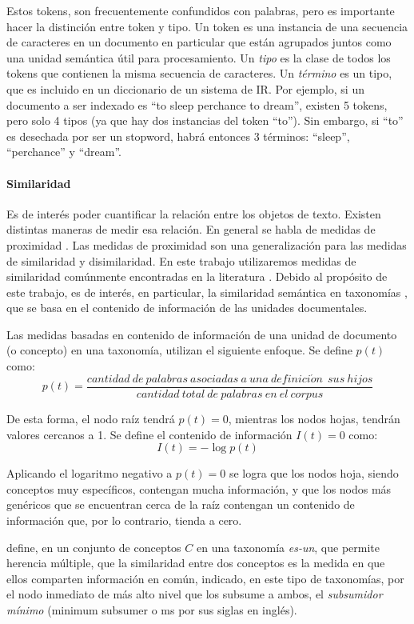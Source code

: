 Estos tokens, son frecuentemente confundidos con palabras, pero es importante hacer la distinción entre token y tipo. Un token es una instancia de una secuencia de caracteres en un documento en particular que están agrupados juntos como una unidad semántica útil para procesamiento. Un \textit{tipo} es la clase de todos los tokens que contienen la misma secuencia de caracteres. Un \textit{término} es un tipo, que es incluido en un diccionario de un sistema de IR. Por ejemplo, si un documento a ser indexado es “to sleep perchance to dream”, existen 5 tokens, pero solo 4 tipos (ya que hay dos instancias del token “to”). Sin embargo, si “to” es desechada por ser un stopword, habrá entonces 3 términos: “sleep”, “perchance” y “dream”.

\paragraph{Similaridad}
Es de interés poder cuantificar la relación entre los objetos de texto. Existen distintas maneras de medir esa relación. En general se habla de medidas de proximidad \citep{xu2008clustering}. Las medidas de proximidad son una generalización para las medidas de similaridad y disimilaridad. En este trabajo utilizaremos medidas de similaridad comúnmente encontradas en la literatura \citep{resnik1995using, lin1998information, gomaa2013survey, harispe2015semantic}. Debido al propósito de este trabajo, es de interés, en particular, la similaridad semántica en taxonomías \citep{resnik1995using}, que se basa en el contenido de información de las unidades documentales.

\bigskip Las medidas basadas en contenido de información de una unidad de documento (o concepto) en una taxonomía, utilizan el siguiente enfoque. Se define \(p(t)\) como:
\[p(t)=\frac{cantidad\>de\>palabras\>asociadas\>a\>una\>definici\acute{o}n\>\>sus\>hijos}{cantidad\>total\>de\>palabras\>en\>el\>corpus}\]

\bigskip De esta forma, el nodo raíz tendrá \(p(t) =0\), mientras los nodos hojas, tendrán valores cercanos a 1. Se define el contenido de información \(I(t) =0\) como:
\[I(t)=-\log p(t)\]

\bigskip Aplicando el logaritmo negativo a \(p(t) =0\) se logra que los nodos hoja, siendo conceptos muy específicos, contengan mucha información, y que los nodos más genéricos que se encuentran cerca de la raíz contengan un contenido de información que, por lo contrario, tienda a cero.

\bigskip \cite{resnik1995using} define, en un conjunto de conceptos \(C\) en una taxonomía \textit{es-un}, que permite herencia múltiple, que la similaridad entre dos conceptos es la medida en que ellos comparten información en común, indicado, en este tipo de taxonomías, por el nodo inmediato de más alto nivel que los subsume a ambos, el \textit{subsumidor mínimo} (minimum subsumer o ms por sus siglas en inglés). 

